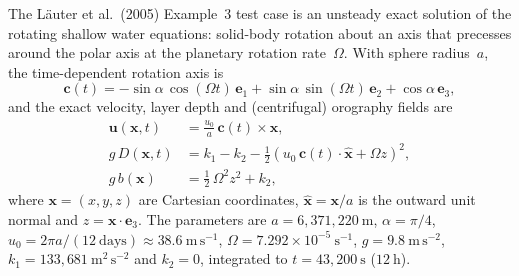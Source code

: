 
The L\"auter et al.\ (2005) Example~3 test case is an unsteady exact solution of the
rotating shallow water equations: solid-body rotation about an axis that precesses
around the polar axis at the planetary rotation rate~$\Omega$. With sphere
radius~$a$, the time-dependent rotation axis is
%
\begin{equation}
  \mathbf{c}(t) = -\sin\alpha\,\cos(\Omega t)\,\mathbf{e}_1
                  + \sin\alpha\,\sin(\Omega t)\,\mathbf{e}_2
                  + \cos\alpha\,\mathbf{e}_3 ,
  \label{eq:lauter-axis}
\end{equation}
%
and the exact velocity, layer depth and (centrifugal) orography fields are
%
\begin{align}
  \mathbf{u}(\mathbf{x},t) &= \frac{u_0}{a}\,\mathbf{c}(t)\times\mathbf{x}, \label{eq:lauter-u}\\
  g\,D(\mathbf{x},t)       &= k_1 - k_2
       - \tfrac12\!\left(u_0\,\mathbf{c}(t)\cdot\hat{\mathbf{x}} + \Omega z\right)^{2},
       \label{eq:lauter-D}\\
  g\,b(\mathbf{x})         &= \tfrac12\,\Omega^{2} z^{2} + k_2 ,
       \label{eq:lauter-b}
\end{align}
%
where $\mathbf{x}=(x,y,z)$ are Cartesian coordinates, $\hat{\mathbf{x}}=\mathbf{x}/a$
is the outward unit normal and $z=\mathbf{x}\cdot\mathbf{e}_3$. The parameters are
$a = 6{,}371{,}220~\mathrm{m}$, $\alpha = \pi/4$,
$u_0 = 2\pi a/(12~\mathrm{days}) \approx 38.6~\mathrm{m\,s^{-1}}$,
$\Omega = 7.292\times10^{-5}~\mathrm{s^{-1}}$, $g = 9.8~\mathrm{m\,s^{-2}}$,
$k_1 = 133{,}681~\mathrm{m^2\,s^{-2}}$ and $k_2 = 0$, integrated to
$t = 43{,}200~\mathrm{s}$ ($12~\mathrm{h}$).



